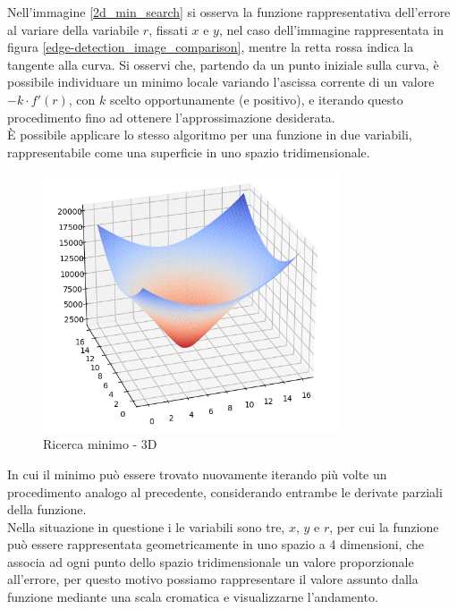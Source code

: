 \documentclass[12pt]{article}
\begin{document}
        Nell'immagine \ref{2d_min_search} si osserva la funzione rappresentativa dell'errore al variare della variabile $r$, fissati $x$ e $y$, nel caso dell'immagine rappresentata in figura \ref{edge-detection_image_comparison}, mentre la retta rossa indica la tangente alla curva. Si osservi che, partendo da un punto iniziale sulla curva, è possibile individuare un minimo locale variando l'ascissa corrente di un valore $-k \cdot f'(r)$, con $k$ scelto opportunamente (e positivo), e iterando questo procedimento fino ad ottenere l'approssimazione desiderata.\\
        
        È possibile applicare lo stesso algoritmo per una funzione in due variabili, rappresentabile come una superficie in uno spazio tridimensionale.
        
        \begin{figure}[h]
        \centering
            \includegraphics[width=250pt]{Draws/matplotlib_draws/3d_descent_base_cut.png}
            \caption{Ricerca minimo - 3D}
            \label{3d_min_search}
        \end{figure}
        
        In cui il minimo può essere trovato nuovamente iterando più volte un procedimento analogo al precedente, considerando entrambe le derivate parziali della funzione.\\
        
        Nella situazione in questione i le variabili sono tre, $x$, $y$ e $r$, per cui la funzione può essere rappresentata geometricamente in uno spazio a 4 dimensioni, che associa ad ogni punto dello spazio tridimensionale un valore proporzionale all'errore, per questo motivo possiamo rappresentare il valore assunto dalla funzione mediante una scala cromatica e visualizzarne l'andamento.
        
\end{document}
